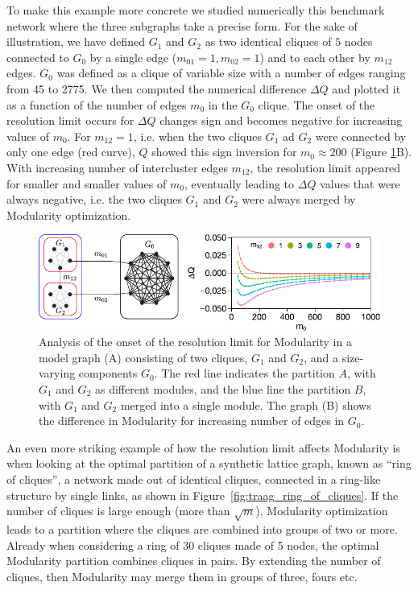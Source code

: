 To make this example more concrete we studied numerically this benchmark network where the three subgraphs take a precise form. For the sake of illustration, we have defined $G_1$ and $G_2$ as two identical cliques of $5$ nodes connected to $G_0$ by a single edge ($m_{01}=1, m_{02}=1$) and to each other by $m_{12}$ edges. $G_0$ was defined as a clique of variable size with a number of edges ranging from 45 to 2775. We then computed the numerical difference $\Delta Q$ and plotted it as a function of the number of edges $m_0$ in the $G_0$ clique. The onset of the resolution limit occurs for $\Delta Q$ changes sign and becomes negative for increasing values of $m_0$. For $m_{12}=1$, i.e. when the two cliques $G_1$ ad $G_2$ were connected by only one edge (red curve), $Q$ showed this sign inversion for $m_0 \approx 200$ (Figure \ref{fig:figure_1_barthelemy}B). With increasing number of intercluster edges $m_{12}$, the resolution limit appeared for smaller and smaller values of $m_0$, eventually leading to $\Delta Q$ values that were always negative, i.e. the two cliques $G_1$ and $G_2$ were always merged by Modularity optimization.


\begin{figure}[htb!]
\centering
\includegraphics[width=1\textwidth]{images/barthelemy_modularity.pdf}
\caption{Analysis of the onset of the resolution limit for Modularity in a model graph (A) consisting of two cliques, $G_1$ and $G_2$, and a size-varying components $G_0$. The red line indicates the partition $A$, with $G_1$ and $G_2$ as different modules, and the blue line the partition $B$, with $G_1$ and $G_2$ merged into a single module. The graph (B) shows the difference in Modularity for increasing number of edges in $G_0$.}
\label{fig:figure_1_barthelemy}
\end{figure}

An even more striking example of how the resolution limit affects Modularity is when looking at the optimal partition of a synthetic lattice graph, known as ``ring of cliques'', a network made out of identical cliques, connected in a ring-like structure by single links, as shown in Figure~\ref{fig:traag_ring_of_cliques}. If the number of cliques is large enough (more than $\sqrt{m}$), Modularity optimization leads to a partition where the cliques are combined into groups of two or more. Already when considering a ring of 30 cliques made of 5 nodes, the optimal Modularity partition combines cliques in pairs. By extending the number of cliques, then Modularity may merge them in groups of three, fours etc.


